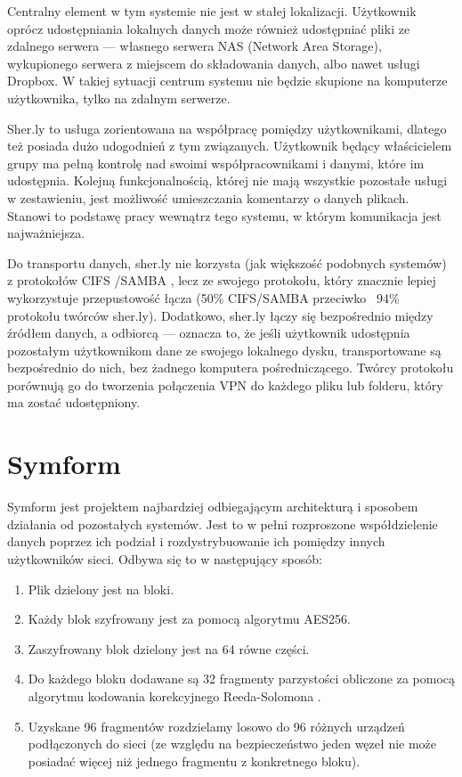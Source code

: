 \documentclass[polish,a4paper,twoside]{ppfcmthesis}
\begin{document}
Centralny element w tym systemie nie jest w stałej lokalizacji. Użytkownik oprócz udostępniania lokalnych danych może również udostępniać pliki ze zdalnego serwera --- własnego serwera NAS (Network Area Storage), wykupionego serwera z miejscem do składowania danych, albo nawet usługi Dropbox. W takiej sytuacji centrum systemu nie będzie skupione na komputerze użytkownika, tylko na zdalnym serwerze.

Sher.ly to usługa zorientowana na współpracę pomiędzy użytkownikami, dlatego też posiada dużo udogodnień z tym związanych. Użytkownik będący właścicielem grupy ma pełną kontrolę nad swoimi współpracownikami i danymi, które im udostępnia. Kolejną funkcjonalnością, której nie mają wszystkie pozostałe usługi w zestawieniu, jest możliwość umieszczania komentarzy o danych plikach. Stanowi to podstawę pracy wewnątrz tego systemu, w którym komunikacja jest najważniejsza.

Do transportu danych, sher.ly nie korzysta (jak większość podobnych systemów) z protokołów CIFS \cite{cifs}/SAMBA \cite{samba}, lecz ze swojego protokołu, który znacznie lepiej wykorzystuje przepustowość łącza (50\% CIFS/SAMBA przeciwko ~94\% protokołu twórców sher.ly). Dodatkowo, sher.ly łączy się bezpośrednio między źródłem danych, a odbiorcą --- oznacza to, że jeśli użytkownik udostępnia pozostałym użytkownikom dane ze swojego lokalnego dysku, transportowane są bezpośrednio do nich, bez żadnego komputera pośredniczącego. Twórcy protokołu porównują go do tworzenia połączenia VPN do każdego pliku lub folderu, który ma zostać udostępniony.

\section*{Symform}

Symform \cite{symform} jest projektem najbardziej odbiegającym architekturą i sposobem działania od pozostałych systemów. Jest to w pełni rozproszone współdzielenie danych poprzez ich podział i rozdystrybuowanie ich pomiędzy innych użytkowników sieci. Odbywa się to w następujący sposób:

\begin{enumerate}[noitemsep]
 \item Plik dzielony jest na bloki.
 \item Każdy blok szyfrowany jest za pomocą algorytmu AES256.
 \item Zaszyfrowany blok dzielony jest na 64 równe części.
 \item Do każdego bloku dodawane są 32 fragmenty parzystości obliczone za pomocą algorytmu kodowania korekcyjnego Reeda-Solomona \cite{rscode}.
 \item Uzyskane 96 fragmentów rozdzielamy losowo do 96 różnych urządzeń podłączonych do sieci (ze względu na bezpieczeństwo jeden węzeł nie może posiadać więcej niż jednego fragmentu z konkretnego bloku).
\end{enumerate}
\end{document}
